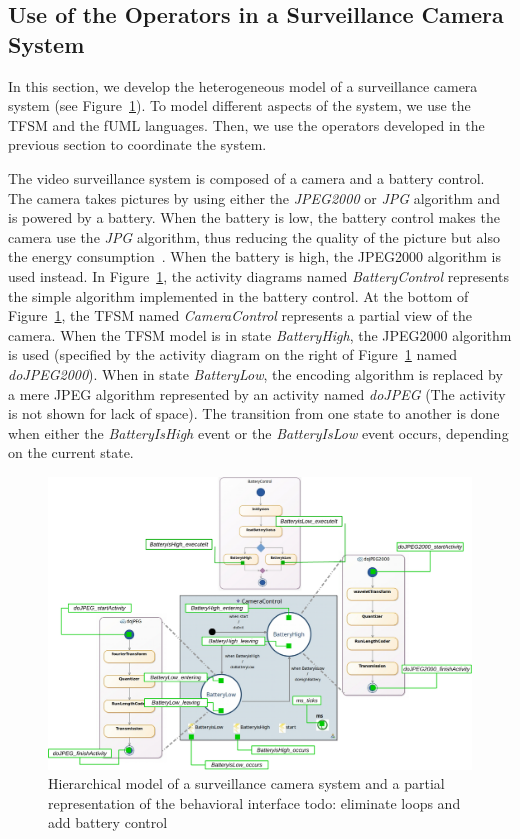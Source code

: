 \subsection{Use of the Operators in a Surveillance Camera System}
	
		
In this section, we develop the heterogeneous model of a surveillance camera system (see Figure~\ref{fig:camerasystem}). To model different aspects of the system, we use the TFSM and the fUML languages. Then, we use the operators developed in the previous section to coordinate the system.
	
The video surveillance system is composed of a camera and a battery control. The camera takes pictures by using either the \emph{JPEG2000} or \emph{JPG} algorithm and is powered by a battery. When the battery is low, the battery control makes the camera use the \emph{JPG} algorithm, thus reducing the quality of the picture but also the energy consumption~\cite{encodingcomparison}. When the battery is high, the JPEG2000 algorithm is used instead. In Figure~\ref{fig:camerasystem}, the activity diagrams named \emph{BatteryControl} represents the simple algorithm implemented in the battery control. At the bottom of Figure~\ref{fig:camerasystem}, the TFSM named \emph{CameraControl} represents a partial view of the camera. When the TFSM model is in state \emph{BatteryHigh}, the JPEG2000 algorithm is used (specified by the activity diagram on the right of Figure~\ref{fig:camerasystem} named \emph{doJPEG2000}). When in state \emph{BatteryLow}, the encoding algorithm is replaced by a mere JPEG algorithm represented by an activity named \emph{doJPEG} (The activity is not shown for lack of space). The transition from one state to another is done when either the \emph{BatteryIsHigh} event or the \emph{BatteryIsLow} event occurs, depending on the current state.	 
	
	\begin{figure}
		\center
		\includegraphics[width=1\columnwidth]{examples/figs/picmodels.pdf}
		\caption{Hierarchical model of a surveillance camera system and a partial representation of the behavioral interface todo: eliminate loops and add battery control}
		\label{fig:camerasystem}
	\end{figure}
	
